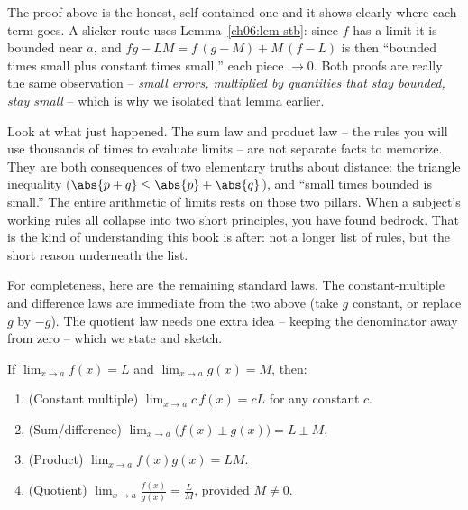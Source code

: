 \begin{remark}
\label{ch06:rem-prod}
The proof above is the honest, self-contained one and it shows clearly where each
term goes. A slicker route uses Lemma~\ref{ch06:lem-stb}: since $f$ has a limit it
is bounded near $a$, and $fg-LM = f\,(g-M) + M\,(f-L)$ is then ``bounded times
small plus constant times small,'' each piece $\to 0$. Both proofs are really the
same observation -- \emph{small errors, multiplied by quantities that stay
bounded, stay small} -- which is why we isolated that lemma earlier.
\end{remark}

\begin{aestheticbox}
Look at what just happened. The sum law and product law -- the rules you will use
thousands of times to evaluate limits -- are not separate facts to memorize.
They are both consequences of two elementary truths about distance: the triangle
inequality ($\abs{p+q}\le\abs{p}+\abs{q}$), and ``small times bounded is small.''
The entire arithmetic of limits rests on those two pillars. When a subject's
working rules all collapse into two short principles, you have found bedrock.
That is the kind of understanding this book is after: not a longer list of rules,
but the short reason underneath the list.
\end{aestheticbox}

For completeness, here are the remaining standard laws. The constant-multiple and
difference laws are immediate from the two above (take $g$ constant, or replace
$g$ by $-g$). The quotient law needs one extra idea -- keeping the denominator
away from zero -- which we state and sketch.

\begin{theorem}
\label{ch06:thm-laws}
If $\lim_{x\to a}f(x)=L$ and $\lim_{x\to a}g(x)=M$, then:
\begin{enumerate}
\item (Constant multiple) $\displaystyle\lim_{x\to a} c\,f(x) = cL$ for any
  constant $c$.
\item (Sum/difference) $\displaystyle\lim_{x\to a}\big(f(x)\pm g(x)\big) = L\pm M$.
\item (Product) $\displaystyle\lim_{x\to a} f(x)g(x) = LM$.
\item (Quotient) $\displaystyle\lim_{x\to a}\frac{f(x)}{g(x)} = \frac{L}{M}$,
  provided $M\ne 0$.
\end{enumerate}
\end{theorem}

